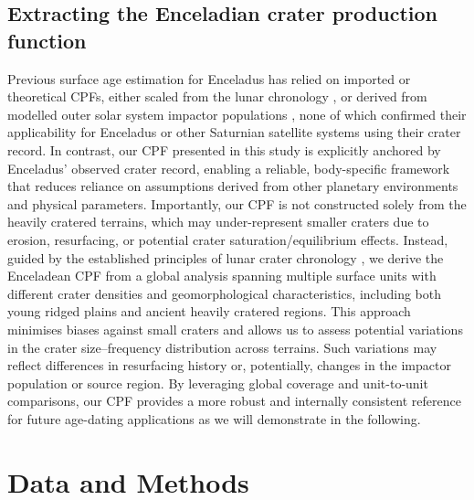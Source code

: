 \documentclass[preprint,11pt,3p,times,authoryear]{elsarticle}
\begin{document}
\subsection{Extracting the Enceladian crater production function} 
Previous surface age estimation for Enceladus has relied on imported or theoretical CPFs, either scaled from the lunar chronology \citep{Spencer2006}, or derived from modelled outer solar system impactor populations \citep{Kirchoff2009,Wong2023,Bottke2024}, none of which confirmed their applicability for Enceladus or other Saturnian satellite systems using their crater record.
In contrast, our CPF presented in this study is explicitly anchored by Enceladus' observed crater record, enabling a reliable, body-specific framework that reduces reliance on assumptions derived from other planetary environments and physical parameters. Importantly, our CPF is not constructed solely from the heavily cratered terrains, which may under-represent smaller craters due to erosion, resurfacing, or potential crater saturation/equilibrium effects. Instead, guided by the established principles of lunar crater chronology \citep{Neukum1983}, we derive the Enceladean CPF from a global analysis spanning multiple surface units with different crater densities and geomorphological characteristics, including both young ridged plains and ancient heavily cratered regions. This approach minimises biases against small craters and allows us to assess potential variations in the crater size–frequency distribution across terrains. Such variations may reflect differences in resurfacing history or, potentially, changes in the impactor population or source region. By leveraging global coverage and unit-to-unit comparisons, our CPF provides a more robust and internally consistent reference for future age-dating applications as we will demonstrate in the following. 


\section{Data and Methods}
\label{sec:data}
\end{document}
